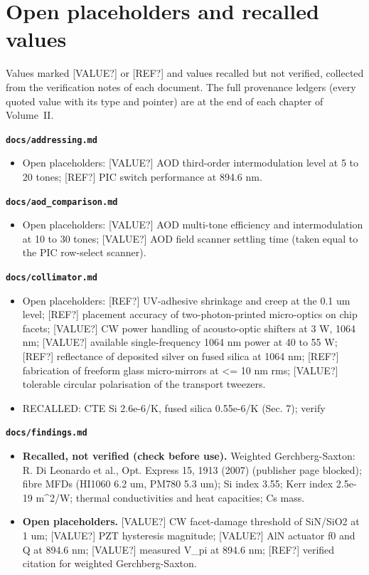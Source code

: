 \section{Open placeholders and recalled values}\label{app:ledger}
Values marked [VALUE?] or [REF?] and values recalled but not verified, collected from the verification notes of each document. The full provenance ledgers (every quoted value with its type and pointer) are at the end of each chapter of Volume~II.

\textbf{\texttt{docs/addressing.md}}

\begin{itemize}
\tightlist
\item
  Open placeholders: {[}VALUE?{]} AOD third-order intermodulation level
  at 5 to 20 tones; {[}REF?{]} PIC switch performance at 894.6 nm.
\end{itemize}

\textbf{\texttt{docs/aod\_\allowbreak{}comparison.md}}

\begin{itemize}
\tightlist
\item
  Open placeholders: {[}VALUE?{]} AOD multi-tone efficiency and
  intermodulation at 10 to 30 tones; {[}VALUE?{]} AOD field scanner
  settling time (taken equal to the PIC row-select scanner).
\end{itemize}

\textbf{\texttt{docs/collimator.md}}

\begin{itemize}
\tightlist
\item
  Open placeholders: {[}REF?{]} UV-adhesive shrinkage and creep at the
  0.1 um level; {[}REF?{]} placement accuracy of two-photon-printed
  micro-optics on chip facets; {[}VALUE?{]} CW power handling of
  acousto-optic shifters at 3 W, 1064 nm; {[}VALUE?{]} available
  single-frequency 1064 nm power at 40 to 55 W; {[}REF?{]} reflectance
  of deposited silver on fused silica at 1064 nm; {[}REF?{]} fabrication
  of freeform glass micro-mirrors at \textless= 10 nm rms; {[}VALUE?{]}
  tolerable circular polarisation of the transport tweezers.
\item
  RECALLED: CTE Si 2.6e-6/K, fused silica 0.55e-6/K (Sec. 7); verify
\end{itemize}

\textbf{\texttt{docs/findings.md}}

\begin{itemize}
\tightlist
\item
  \textbf{Recalled, not verified (check before use).} Weighted
  Gerchberg-Saxton: R. Di Leonardo et al., Opt. Express 15, 1913 (2007)
  (publisher page blocked); fibre MFDs (HI1060 6.2 um, PM780 5.3 um); Si
  index 3.55; Kerr index 2.5e-19 m\^{}2/W; thermal conductivities and
  heat capacities; Cs mass.
\item
  \textbf{Open placeholders.} {[}VALUE?{]} CW facet-damage threshold of
  SiN/SiO2 at 1 um; {[}VALUE?{]} PZT hysteresis magnitude; {[}VALUE?{]}
  AlN actuator f0 and Q at 894.6 nm; {[}VALUE?{]} measured V\_\allowbreak{}pi at
  894.6 nm; {[}REF?{]} verified citation for weighted Gerchberg-Saxton.
\end{itemize}

